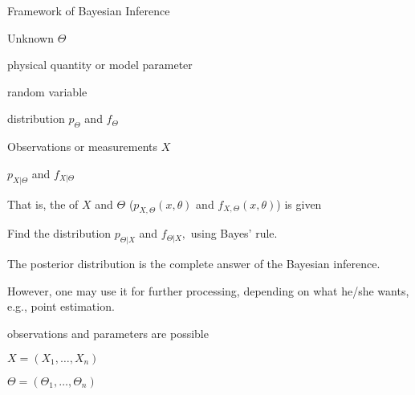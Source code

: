 \begin{frame}{Framework of Bayesian Inference}

\begin{center}
\end{center}

\vspace{-0.4cm}
{
\small
  \plitemsep 0.03in
\bci
\item<2-> Unknown $\Theta$

\bci
\item physical quantity or model parameter
\item random variable
\item {} distribution $p_{\Theta}$ and $f_{\Theta}$
\eci

\item<3-> Observations or measurements $X$

\bci
\item {} $p_{X|\Theta}$ and $f_{X|\Theta}$
\eci

\item<4-> That is, the  of $X$ and $\Theta$ ($p_{X,\Theta}(x,\theta)$ and $f_{X,\Theta}(x,\theta)$) is given
\item<5-> Find the  distribution $p_{\Theta|X}$ and
  $f_{\Theta|X},$ using Bayes' rule.

  \eci
}
{
\small
  \plitemsep 0.08in
\bci

\item<5-> The posterior distribution is the complete answer of the
  Bayesian inference.

\item<6-> However, one may use it for further processing,
  depending on what he/she wants, e.g., point estimation. 
  
\item<7->  observations and  parameters are possible
  \bci
\item   $X = (X_1, \ldots, X_n)$
  \item $\Theta = (\Theta_1, \ldots, \Theta_n)$
  \eci

  \eci
}
\end{frame}







